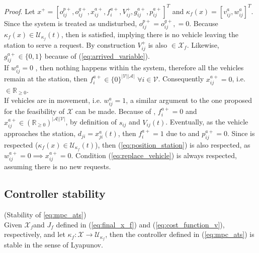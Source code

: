 \textit{Proof}. Let $x^+ = [o_{ij}^{p+}, o_{ij}^{g+}, x_{ij}^{a+}, f^{a+}_{i}, V_{ij}^{+}, g^{a+}_{ij}, p^{a+}_{ij}]^T$ and $\kappa_f(x) = [v^{a}_{ij}, w^{a}_{ij}]^T$. Since the system is treated as undisturbed, $o_{ij}^{p+}= o_{ij}^{g+},=0$. Because $\kappa_f(x) \in \mathcal{U}_{\kappa_f}(t)$, then  is satisfied, implying there is no vehicle leaving the station to serve a request. By construction $V_{ij}^{+}$ is also $\in \mathcal{X}_f$. Likewise, $g^{a+}_{ij}\in \{0,1\}$ because of (\ref{eq:arrived_variable}). \\
If $w^a_{ij} = 0$ , then nothing happens within the system, therefore all the vehicles remain at the station, then $ f^{a+}_{i} \in \{0\}^{|\mathcal{V}||\mathcal{A}|}$ $\forall i \in \mathcal{V}$. Consequently   $x_{ij}^{a+} = 0$, i.e.  $\in \mathbb{R}_{\ge 0}$.\\
If vehicles are in movement, i.e. $w^a_{ij} = 1$, a similar argument to the one proposed for the feasibility of $\mathcal{X}$ can be made. Because of , $f^{a+}_{i}=0$ and $x_{ij}^{a+}\in (\mathbb{R}_{\ge 0})^{|\mathcal{A}||\mathcal{V}|}$, by definition of $s_{ij}$ and $V_{ij}(t)$. Eventually, as the vehicle approaches the station, $d_{ji} = x^a_{ji}(t)$, then $f^{a+}_{i}=1$ due to  and $p^{a+}_{ij}=0$. Since 
 is respected ($\kappa_f(x) \in \mathcal{U}_{\kappa_f}(t)$), then  (\ref{eq:position_station}) is also respected, as $ w^{a+}_{ij}=0 \implies x_{ij}^{a+}=0$. Condition (\ref{eq:replace_vehicle}) is always respected, assuming there is no new requests. \\



\subsection*{Controller stability}


\begin{proposition}{(Stability of \ref{eq:mpc_ats})}\\

	Given $\mathcal{X}_f$and $J_f$ defined in (\ref{eq:final_x_f}) and (\ref{eq:cost_function_v}), respectively, and let $\kappa_f:\mathcal{X}\rightarrow\mathcal{U}_{\kappa_f}$,  then the controller defined in (\ref{eq:mpc_ats}) is stable in the sense of Lyapunov.
\end{proposition}\\

